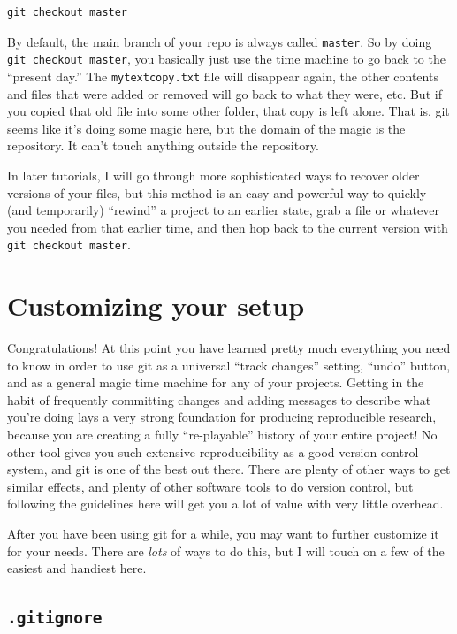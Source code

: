 \documentclass{article}
\begin{document}
\begin{verbatim}
git checkout master
\end{verbatim}

By default, the main branch of your repo is always called \texttt{master}. So by doing \texttt{git checkout master}, you basically just use the time machine to go back to the ``present day.'' The \texttt{mytextcopy.txt} file will disappear again, the other contents and files that were added or removed will go back to what they were, etc.  But if you copied that old file into some other folder, that copy is left alone.  That is, git seems like it's doing some magic here, but the domain of the magic is the repository.  It can't touch anything outside the repository.

In later tutorials, I will go through more sophisticated ways to recover older versions of your files, but this method is an easy and powerful way to quickly (and temporarily) ``rewind'' a project to an earlier state, grab a file or whatever you needed from that earlier time, and then hop back to the current version with \texttt{git checkout master}.
\section{Customizing your setup}
\label{sec-10}

Congratulations! At this point you have learned pretty much everything you need to know in order to use git as a universal ``track changes'' setting, ``undo'' button, and as a general magic time machine for any of your projects.  Getting in the habit of frequently committing changes and adding messages to describe what you're doing lays a very strong foundation for producing reproducible research, because you are creating a fully ``re-playable'' history of your entire project!  No other tool gives you such extensive reproducibility as a good version control system, and git is one of the best out there. There are plenty of other ways to get similar effects, and plenty of other software tools to do version control, but following the guidelines here will get you a lot of value with very little overhead.

After you have been using git for a while, you may want to further customize it for your needs.  There are \emph{lots} of ways to do this, but I will touch on a few of the easiest and handiest here.
\subsection{\texttt{.gitignore}}
\label{sec-10-1}
\end{document}
